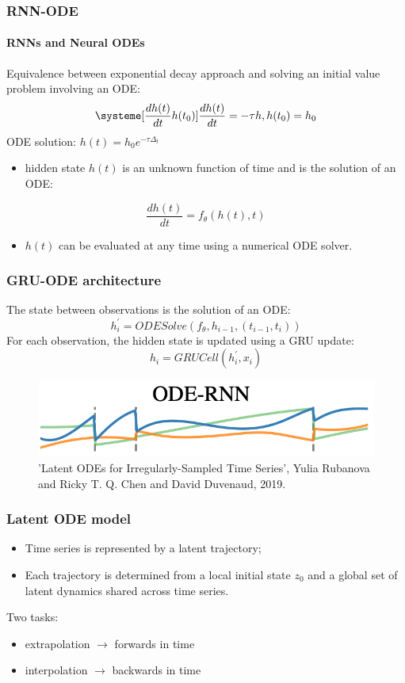 \documentclass{beamer}
\begin{document}
{%
\begin{frame}
	\frametitle{RNN-ODE}
	\framesubtitle{RNNs and Neural ODEs}
	Equivalence between exponential decay approach and solving an initial value problem involving an ODE:
	\[ \systeme[\frac{dh(t)}{dt} h(t_{0})]{\frac{dh(t)}{dt}=-\tau h, h(t_{0})=h_{0}} \]
	\hfill \break
	\pause ODE solution: $h(t)=h_{0}e^{-\tau \Delta_{t}}$
	\hfill \break
	\begin{itemize}
	\pause \item{hidden state $h(t)$ is an unknown function of time and is the solution of an ODE:}
	\end{itemize}
	$$\frac{dh(t)}{dt}=f_{\theta}(h(t),t)$$
	\begin{itemize}
	\pause \item{$h(t)$ can be evaluated at any time using a numerical ODE solver.}
	\end{itemize}
\end{frame}
\begin{frame}
	\frametitle{GRU-ODE architecture}
	The state between observations is the solution of an ODE:
	$$h_{i}^{'}=ODESolve(f_{\theta}, h_{i-1}, (t_{i-1},t_{i}))$$
	\hfill \break
	\pause For each observation, the hidden state is updated using a GRU update:
	$$h_{i}=GRUCell(h_{i}^{'},x_{i})$$
	\begin{figure}
	\includegraphics[height=0.16\linewidth]{ODE_RNN.png}
	\caption*{'Latent ODEs for Irregularly-Sampled Time Series', Yulia Rubanova and Ricky T. Q. Chen and David Duvenaud, 2019.}
	\end{figure}
\end{frame}
\begin{frame}
	\frametitle{Latent ODE model}
	\begin{itemize}
	\item{Time series is represented by a latent trajectory;}
	\pause \item{Each trajectory is determined from a local initial state $z_{0}$ and a global set of latent dynamics shared across time series.}
	\end{itemize}
	\hfill \break
	\pause Two tasks:
	\begin{itemize}
	\item{extrapolation $\rightarrow$ forwards in time}
	\item{interpolation $\rightarrow$ backwards in time}
	\end{itemize}




\end{frame}}
\end{document}
